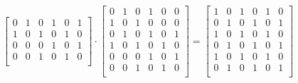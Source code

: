 \documentclass[fleqn, 12pt]{article}
\theoremstyle{definition}
\begin{document}
\begin{gather*}
\begin{bmatrix}
0 & 1 & 0 & 1 & 0 & 1 \\
1 & 0 & 1 & 0 & 1 & 0 \\
0 & 0 & 0 & 1 & 0 & 1 \\
0 & 0 & 1 & 0 & 1 & 0  \\
\end{bmatrix}
\cdot
\begin{bmatrix}
0 & 1 & 0 & 1 & 0 & 0 \\
1 & 0 & 1 & 0 & 0 & 0 \\
0 & 1 & 0 & 1 & 0 & 1 \\
1 & 0 & 1 & 0 & 1 & 0 \\
0 & 0 & 0 & 1 & 0 & 1 \\
0 & 0 & 1 & 0 & 1 & 0  \\
\end{bmatrix}
= 
\begin{bmatrix}
1 & 0 & 1 & 0 & 1 & 0 \\
0 & 1 & 0 & 1 & 0 & 1 \\
1 & 0 & 1 & 0 & 1 & 0 \\
0 & 1 & 0 & 1 & 0 & 1 \\
1 & 0 & 1 & 0 & 1 & 0 \\
0 & 1 & 0 & 1 & 0 & 1  \\
\end{bmatrix} 
\end{gather*}
\end{document}
